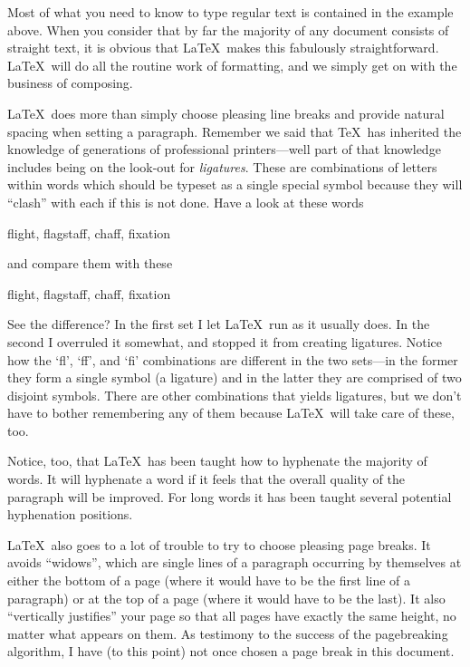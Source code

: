 Most of what you need to know to type regular text is contained in the
example above.  When you consider that by far the majority of any document
consists of straight text, it is obvious that \LaTeX\ makes this fabulously straightforward.
\LaTeX\ will do all the routine work of formatting, and we simply get on with the
business of composing.

\LaTeX\ does more than simply choose pleasing line breaks and
provide natural spacing when setting a paragraph.  Remember we
said that \TeX\ has inherited the knowledge of generations of
professional printers---well part of that knowledge includes
being on the look-out for {\em ligatures}.  These are combinations
of letters within words which should be typeset as a single special
symbol because they will ``clash'' with each if this is not done.
Have a look at these words
\begin{center}
flight, flagstaff, chaff, fixation
\end{center}
and compare them with these
\begin{center}
f{l}ight, f{l}agstaf{f}, chaf{f}, f{i}xation
\end{center}
See the difference?  In the first set I let \LaTeX\ run as it usually does.
In the second I overruled it somewhat, and stopped it from creating
ligatures.  Notice how the `fl', `ff', and `fi' combinations are different
in the two sets---in the former they form a single symbol (a ligature)
and in the latter they are comprised of two disjoint symbols.  There
are other combinations that yields ligatures, but we don't have to bother
remembering any of them because \LaTeX\ will take care of these, too.

Notice, too, that \LaTeX\ has been taught how to hyphenate the
majority of words.  It will hyphenate a word if it feels that the overall
quality of the paragraph will be improved.  For long words it has been
taught several potential hyphenation positions.

\LaTeX\ also goes to a lot of trouble to try to choose pleasing page
breaks.  It avoids ``widows'', which are single lines of a paragraph
occurring by themselves at either the bottom of a page (where
it would have to be the first line of a paragraph) or at the top
of a page (where it would have to be the last).  It also
``vertically justifies'' your page so that all pages have exactly
the same height, no matter what appears on them.  As testimony
to the success of the pagebreaking algorithm, I have (to
this point) not once chosen a page break in this document.

